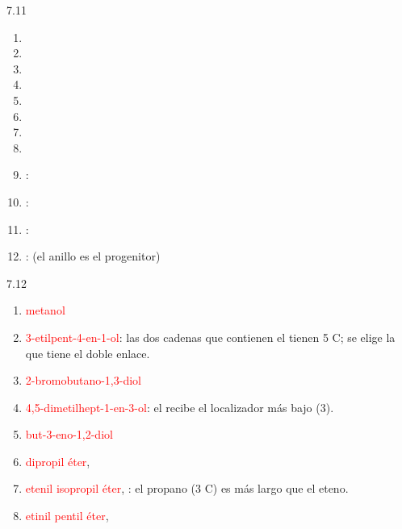 \begin{Solution}{7.11}
        \begin{enumerate}[label=\alph*)]
            \item {}
            \item {}
            \item {}
            \item {}
            \item {}
            \item {}
            \item {}
            \item {}
            \item {}: 
            \item {}: 
            \item {}: 
            \item {}:  (el anillo es el progenitor)
        \end{enumerate}
    
\end{Solution}
\begin{Solution}{7.12}
        \begin{enumerate}[label=\alph*)]
            \item \textcolor{red}{metanol}
            \item \textcolor{red}{3-etilpent-4-en-1-ol}: las dos cadenas que contienen el  tienen 5 C; se elige la que tiene el doble enlace.
            \item \textcolor{red}{2-bromobutano-1,3-diol}
            \item \textcolor{red}{4,5-dimetilhept-1-en-3-ol}: el  recibe el localizador más bajo (3).
            \item \textcolor{red}{but-3-eno-1,2-diol}
            \item \textcolor{red}{dipropil éter}, 
            \item \textcolor{red}{etenil isopropil éter}, : el propano (3 C) es más largo que el eteno.
            \item \textcolor{red}{etinil pentil éter}, 
        \end{enumerate}
    
\end{Solution}
